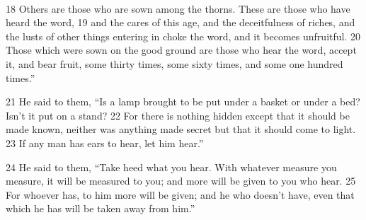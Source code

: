 \documentclass[10pt,a5paper,twoside,twocolumn]{book}
\newcommand*\cleartoleftpage{%
  \ifodd\value{page}\hbox{}\clearpage\fi
}
\newcommand{\separator}{
  \vspace{-0.5\baselineskip}%
  \hspace{0.27\textwidth}%
  \noindent\makebox[\linewidth]{\resizebox{0.3333\linewidth}{1pt}{$\bullet$}}\bigskip%
  \vspace{-0.5\baselineskip}
}
\newenvironment{facing}{\cleartoleftpage}{\clearpage\pagebreak}
\newenvironment{help}{\clearpage}{}
\newenvironment{helpsec}{\begin{minipage}[t]{\textwidth}\begin{multicols}{2}}{\end{multicols}\end{minipage}}
\newenvironment{translation}{\separator\\\begin{helpsec}\footnotesize}{\end{helpsec}}
\begin{document}
\begin{facing}
\begin{help}
\begin{translation}
18  Others are those who are sown among the thorns. These are those who have heard the word, 19  and the cares of this age, and the deceitfulness of riches, and the lusts of other things entering in choke the word, and it becomes unfruitful. 20  Those which were sown on the good ground are those who hear the word, accept it, and bear fruit, some thirty times, some sixty times, and some one hundred times.''

21 He said to them, ``Is a lamp brought to be put under a basket  or under a bed? Isn't it put on a stand? 22  For there is nothing hidden except that it should be made known, neither was anything made secret but that it should come to light. 23  If any man has ears to hear, let him hear.''

24 He said to them, ``Take heed what you hear. With whatever measure you measure, it will be measured to you; and more will be given to you who hear. 25  For whoever has, to him more will be given; and he who doesn't have, even that which he has will be taken away from him.''
\end{translation}
\end{help}
\end{facing}

\end{document}
